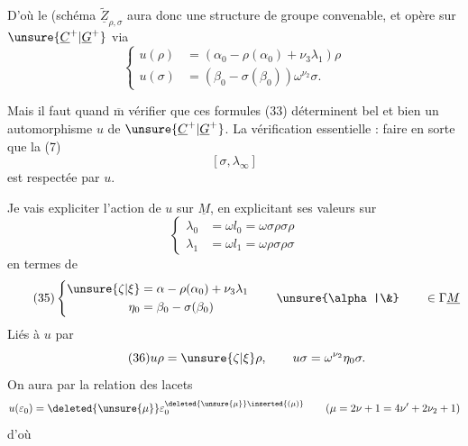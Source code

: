 

D'où le  (schéma 
$\widetilde{\underline Z}_{\rho,\sigma}$ aura donc
une structure de groupe convenable, et
opère sur $\unsure{\underline C^{+}|\underline G^{+}}$ via
\[
\tag{33}
\left\{\begin{aligned}
u(\rho)&=(\alpha_0-\rho(\alpha_0)+\nu_3\lambda_1)\rho\\
u(\sigma)&=(\beta_0-\sigma(\beta_0))\omega^{\nu_2}\sigma.
\end{aligned}\right.
\]

Mais il faut quand $\overline{\mathrm m}$ vérifier que
ces formules (33) déterminent bel et
bien un automorphisme $u$ de $\unsure{\underline C^{+}|\underline G^{+}}$. La
vérification essentielle : faire en sorte
que la  (7)
\[
\tag{34}[\sigma,\lambda_\infty]
\]
est respectée par $u$.

Je vais expliciter l'action de $u$ sur
$\underline M$, en explicitant ses valeurs sur
\[
\left\{\begin{aligned}
\lambda_0&=\omega l_0=\omega\sigma\rho\sigma\rho\\
\lambda_1&=\omega l_1=\omega\rho\sigma\rho\sigma
\end{aligned}\right.
\]
en termes de 
\[
\tag{35}
\left\{\begin{aligned}
\unsure{\zeta|\xi}&=\alpha-\rho(\alpha_0)+\nu_3\lambda_1\\
\eta_0&=\beta_0-\sigma(\beta_0)
\end{aligned}\right.
\qquad\unsure{\alpha|\&}\qquad\in\Gamma\underline M
\]
Liés à $u$ par
\[
\tag{36}
u\rho=\unsure{\zeta|\xi}\rho,\qquad
u\sigma=\omega^{\nu_2}\eta_0\sigma.
\]
On aura  par la relation des lacets
\[
u(\varepsilon_0)=\deleted{\unsure{\mu}}\varepsilon_0^{\deleted{\unsure{\mu}}\inserted{(\mu)}}
\qquad(\mu=2\nu+1=4\nu'+2\nu_2+1)
\]
d'où


